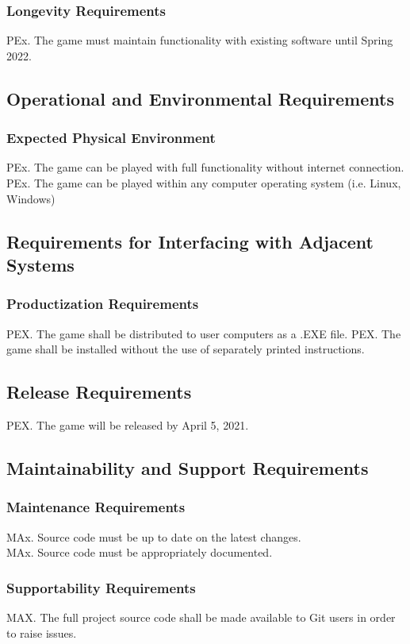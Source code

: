 \documentclass{article}
\begin{document}
    \subsubsection{Longevity Requirements}
    PEx. The game must maintain functionality with existing software until Spring 2022.


\subsection{Operational and Environmental Requirements}
    \subsubsection{Expected Physical Environment}
    PEx. The game can be played with full functionality without internet connection.\\
    PEx. The game can be played within any computer operating system (i.e. Linux, Windows)
    
\subsection{Requirements for Interfacing with Adjacent Systems}
    \subsubsection{Productization Requirements}
    PEX. The game shall be distributed to user computers as a .EXE file.
    PEX. The game shall be installed without the use of separately printed instructions.
    
 \subsection{Release Requirements}
    PEX. The game will be released by April 5, 2021.
    
 \subsection{Maintainability and Support Requirements}
    \subsubsection{Maintenance Requirements}
     MAx. Source code must be up to date on the latest changes.\\
    MAx. Source code must be appropriately documented.
    
    \subsubsection{Supportability Requirements}
    MAX. The full project source code shall be made available to Git users in order to raise issues.
    
\end{document}
